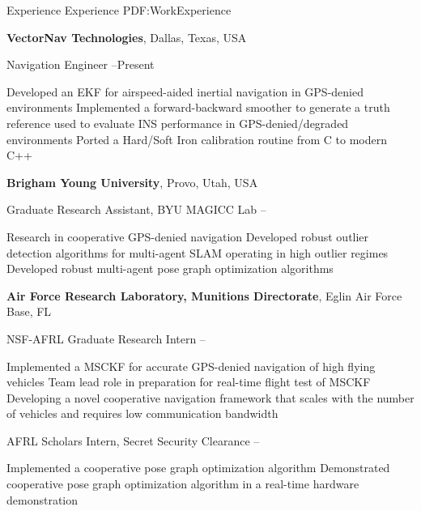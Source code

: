 \documentclass[letterpaper,MMMyyyy,nonstopmode]{simpleresumecv}
\begin{document}
\begin{Body}



\Section
{Experience}
{Experience}
{PDF:WorkExperience}

\Entry
\textbf{VectorNav Technologies},
Dallas, Texas, USA

\Gap
\BulletItem
Navigation Engineer
\hfill
{}--Present
\begin{Detail}
\SubBulletItem
Developed an EKF for airspeed-aided inertial navigation in GPS-denied environments
\SubBulletItem
Implemented a forward-backward smoother to generate a truth reference used to evaluate INS performance in GPS-denied/degraded environments
\SubBulletItem
Ported a Hard/Soft Iron calibration routine from C to modern C++

\end{Detail}

\Entry
\textbf{Brigham Young University},
Provo, Utah, USA

\Gap
\BulletItem
Graduate Research Assistant, BYU MAGICC Lab
\hfill
{}--
\begin{Detail}
\SubBulletItem
Research in cooperative GPS-denied navigation
\SubBulletItem
Developed robust outlier detection algorithms for multi-agent SLAM operating in high outlier regimes
\SubBulletItem
Developed robust multi-agent pose graph optimization algorithms
\end{Detail}

\Entry
\textbf{Air Force Research Laboratory, Munitions Directorate},
Eglin Air Force Base, FL

\Gap
\BulletItem
NSF-AFRL Graduate Research Intern
\hfill
{}--
\begin{Detail}
\SubBulletItem
Implemented a MSCKF for accurate GPS-denied navigation of high flying vehicles
\SubBulletItem
Team lead role in preparation for real-time flight test of MSCKF
\SubBulletItem
Developing a novel cooperative navigation framework that scales with the number of vehicles and requires low communication bandwidth
\end{Detail}

\Gap
\BulletItem
AFRL Scholars Intern, Secret Security Clearance
\hfill
{}--
\begin{Detail}
\SubBulletItem
Implemented a cooperative pose graph optimization algorithm
\SubBulletItem
Demonstrated cooperative pose graph optimization algorithm in a real-time hardware demonstration
\end{Detail}



\end{Body}
\end{document}
